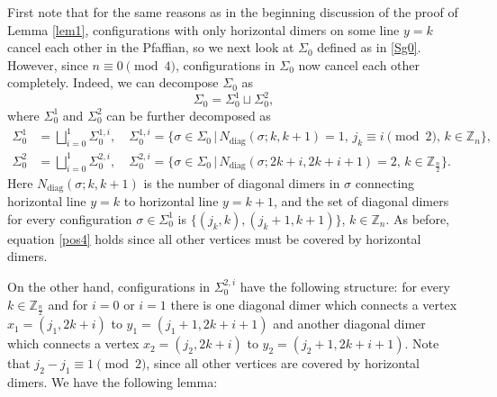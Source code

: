 \documentclass[12pt,reqno]{amsart}
\numberwithin{equation}{section}
\newcommand{\Z}{{\mathbb Z}}
\newcommand{\sg}{\sigma}
\begin{document}
First note that for the same reasons as in the beginning discussion of the proof of Lemma \ref{lem1}, configurations with only horizontal dimers on some line $y=k$ cancel each other in the Pfaffian, so we next look at $\Sigma_0$ defined as in \eqref{Sg0}. However, since $n\equiv 0\pmod 4$, configurations in $\Sigma_0$ now cancel each other completely. Indeed, we can decompose $\Sigma_0$ as
\begin{equation}\label{canceldecomp}
\Sigma_0=\Sigma_0^1\sqcup \Sigma_0^2,
\end{equation}
where $\Sigma_0^1$ and $\Sigma_0^2$ can be further decomposed as
\begin{equation}\label{cancel}
\begin{aligned}
\Sigma_0^1&=\bigsqcup_{i=0}^1\Sigma_0^{1,i},\quad \Sigma_0^{1,i}=\{\sigma\in\Sigma_0\, |\,N_{\textrm{diag}}(\sigma;k,k+1)=1,\,j_k\equiv i\pmod 2,\, k\in \mathbb Z_n\},\\
\Sigma_0^2&=\bigsqcup_{i=0}^1 \Sigma_0^{2,i},\quad \Sigma_0^{2,i}=\big\{\sigma\in\Sigma_0\,|\,N_{\textrm{diag}}(\sigma;2k+i,2k+i+1)=2,\, k\in\mathbb Z_{\frac{n}{2}}\big\}.
\end{aligned}
\end{equation}
Here $N_{\textrm{diag}}(\sigma;k,k+1)$ is the number of diagonal dimers in $\sigma$ connecting horizontal line $y=k$ to horizontal line $y=k+1$, and the set of diagonal dimers for every configuration $\sg\in\Sigma_0^1$ is $\{(j_k,k),(j_k+1,k+1)\}$, $k\in\Z_n$. As before, equation \eqref{pos4} holds since all other vertices must be covered by horizontal dimers.
\par On the other hand, configurations in $\Sigma_0^{2,i}$ have the following structure: for every $k\in\Z_{\frac{n}{2}}$ and for $i=0$ or $i=1$ there
is one diagonal dimer which connects a vertex $x_1=(j_1,2k+i)$ to $y_1=(j_1+1,2k+i+1)$ and another diagonal 
dimer which connects a vertex $x_2=(j_2,2k+i)$ to $y_2=(j_2+1,2k+i+1)$. Note that $j_2-j_1\equiv 1\pmod 2$, since all other vertices are
covered by horizontal dimers. We have the following lemma:
\end{document}
